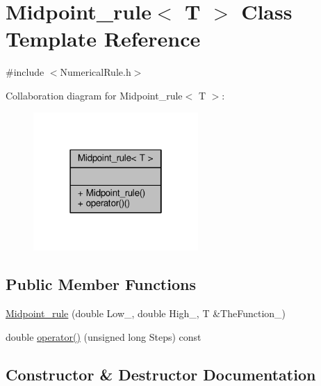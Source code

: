 \hypertarget{classMidpoint__rule}{}\section{Midpoint\+\_\+rule$<$ T $>$ Class Template Reference}
\label{classMidpoint__rule}


{\ttfamily \#include $<$Numerical\+Rule.\+h$>$}



Collaboration diagram for Midpoint\+\_\+rule$<$ T $>$\+:
\nopagebreak
\begin{figure}[H]
\begin{center}
\leavevmode
\includegraphics[width=178pt]{classMidpoint__rule__coll__graph}
\end{center}
\end{figure}
\subsection*{Public Member Functions}
\begin{DoxyCompactItemize}
\item 
\hyperlink{classMidpoint__rule_ad025f47e28203e80301ccc7e8aeb6983}{Midpoint\+\_\+rule} (double Low\+\_\+, double High\+\_\+, T \&The\+Function\+\_\+)
\item 
double \hyperlink{classMidpoint__rule_ab22f2f3e9756e267728e69a9757f9142}{operator()} (unsigned long Steps) const
\end{DoxyCompactItemize}


\subsection{Constructor \& Destructor Documentation}
\hypertarget{classMidpoint__rule_ad025f47e28203e80301ccc7e8aeb6983}{}\label{classMidpoint__rule_ad025f47e28203e80301ccc7e8aeb6983} 
